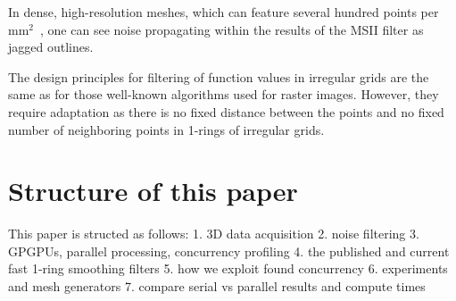 In dense, high-resolution meshes, which can feature several hundred points per mm$^2$~\cite[p.~00]{todoCitation}\todoCitation, one can see noise propagating within the results of the MSII filter as jagged outlines.~\cite[s.~3.2]{Mara17}

The design principles for filtering of function 
values in irregular grids are the same as for those well-known algorithms used 
for raster images. However, they require adaptation as there is no fixed 
distance between the points and no fixed number of neighboring points in 
1-rings of irregular grids.~\cite[s.~3.2]{Mara17}



\section{Structure of this paper}
This paper is structed as follows:
1. 3D data acquisition
2. noise filtering
3. GPGPUs, parallel processing, concurrency profiling
4. the published and current fast 1-ring smoothing filters
5. how we exploit found concurrency
6. experiments and mesh generators
7. compare serial vs parallel results and compute times
